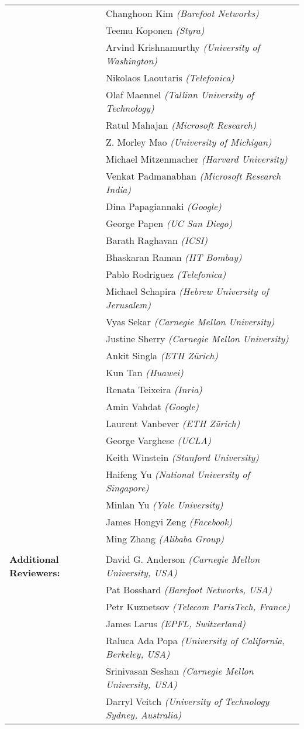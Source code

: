 \documentclass[11pt]{article}
\begin{document}
\begin{supertabular}{ll}
 & Changhoon Kim \emph{(Barefoot Networks)} \\
 & Teemu Koponen \emph{(Styra)} \\
 & Arvind Krishnamurthy \emph{(University of Washington)} \\
 & Nikolaos Laoutaris \emph{(Telefonica)} \\
 & Olaf Maennel \emph{(Tallinn University of Technology)} \\
 & Ratul Mahajan \emph{(Microsoft Research)} \\
 & Z. Morley Mao \emph{(University of Michigan)} \\
 & Michael Mitzenmacher \emph{(Harvard University)} \\
 & Venkat Padmanabhan \emph{(Microsoft Research India)} \\
 & Dina Papagiannaki \emph{(Google)} \\
 & George Papen \emph{(UC San Diego)} \\
 & Barath Raghavan \emph{(ICSI)} \\
 & Bhaskaran Raman \emph{(IIT Bombay)} \\
 & Pablo Rodriguez \emph{(Telefonica)} \\
 & Michael Schapira \emph{(Hebrew University of Jerusalem)} \\
 & Vyas Sekar \emph{(Carnegie Mellon University)} \\
 & Justine Sherry \emph{(Carnegie Mellon University)} \\
 & Ankit Singla \emph{(ETH Zürich)} \\
 & Kun Tan \emph{(Huawei)} \\
 & Renata Teixeira \emph{(Inria)} \\
 & Amin Vahdat \emph{(Google)} \\
 & Laurent Vanbever \emph{(ETH Zürich)} \\
 & George Varghese \emph{(UCLA)} \\
 & Keith Winstein \emph{(Stanford University)} \\
 & Haifeng Yu \emph{(National University of Singapore)} \\
 & Minlan Yu \emph{(Yale University)} \\
 & James Hongyi Zeng \emph{(Facebook)} \\
 & Ming Zhang \emph{(Alibaba Group)} \\
\\
\textbf{Additional Reviewers:}

 & David G. Anderson \emph{(Carnegie Mellon University, USA)} \\
 & Pat Bosshard \emph{(Barefoot Networks, USA)} \\
 & Petr Kuznetsov \emph{(Telecom ParisTech, France)} \\
 & James Larus \emph{(EPFL, Switzerland)} \\
 & Raluca Ada Popa \emph{(University of California, Berkeley, USA)} \\
 & Srinivasan Seshan \emph{(Carnegie Mellon University, USA)} \\
 & Darryl Veitch \emph{(University of Technology Sydney, Australia)} \\

\end{supertabular}
\end{document}
